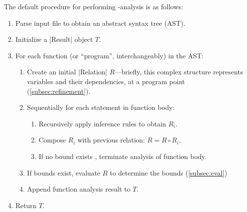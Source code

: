\documentclass[runningheads]{llncs}
\begin{document}
The default procedure for performing \mwp-analysis is as follows: 


\begin{enumerate}
\item Parse input file to obtain an abstract syntax tree (AST). %
\item Initialize a \pr|Result| object $T$.
\item For each function (or \enquote{program}, interchangeably) in the AST: %
\begin{enumerate}
\item Create an initial \pr|Relation| $R$---briefly, this complex structure represents variables and their dependencies, at a program point (\autoref{subsec:refinement}). %

\item Sequentially for each statement in function body:
\begin{enumerate}
\item Recursively apply inference rules to obtain $R_i$. 
\item Compose $R_i$ with previous relation: $R = R \circ R_i$.
\item If no bound exists%
, terminate analysis of function body. 
\end{enumerate}
\item If bounds exist, evaluate $R$ to determine the bounds %
(\autoref{subsec:eval})
\item Append function analysis result to $T$.
\end{enumerate}
\item Return $T$.
\end{enumerate}
\end{document}
